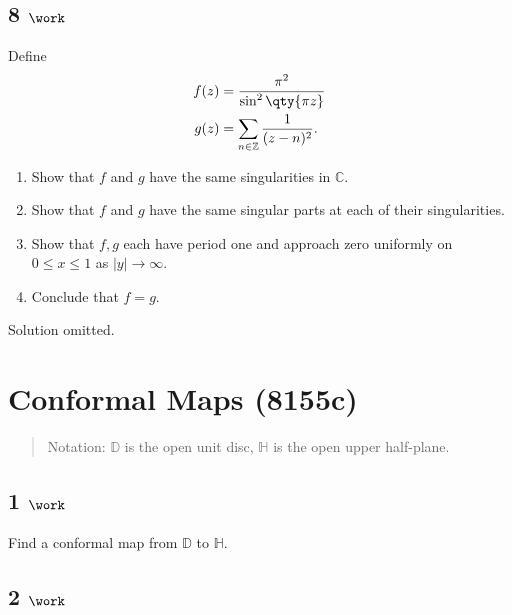 \hypertarget{work-35}{%
\subsection{\texorpdfstring{8
\(\work\)}{8 \textbackslash work}}\label{work-35}}

Define
\begin{align*}
f(z) &= {\pi^2 \over \sin^2 \qty{\pi z} } \\
g(z) &= \sum_{n\in {\mathbb{Z}}} {1\over (z-n)^2}
.\end{align*}

\begin{enumerate}
\def\labelenumi{\alph{enumi}.}
\tightlist
\item
  Show that \(f\) and \(g\) have the same singularities in
  \({\mathbb{C}}\).
\item
  Show that \(f\) and \(g\) have the same singular parts at each of
  their singularities.
\item
  Show that \(f, g\) each have period one and approach zero uniformly on
  \(0\leq x \leq 1\) as \({\left\lvert {y} \right\rvert}\to \infty\).
\item
  Conclude that \(f = g\).
\end{enumerate}


Solution omitted.

\hypertarget{conformal-maps-8155c}{%
\section{Conformal Maps (8155c)}\label{conformal-maps-8155c}}

\begin{quote}
Notation: \({\mathbb{D}}\) is the open unit disc, \({\mathbb{H}}\) is
the open upper half-plane.
\end{quote}

\hypertarget{work-36}{%
\subsection{\texorpdfstring{1
\(\work\)}{1 \textbackslash work}}\label{work-36}}

Find a conformal map from \({\mathbb{D}}\) to \({\mathbb{H}}\).

\hypertarget{work-37}{%
\subsection{\texorpdfstring{2
\(\work\)}{2 \textbackslash work}}\label{work-37}}

